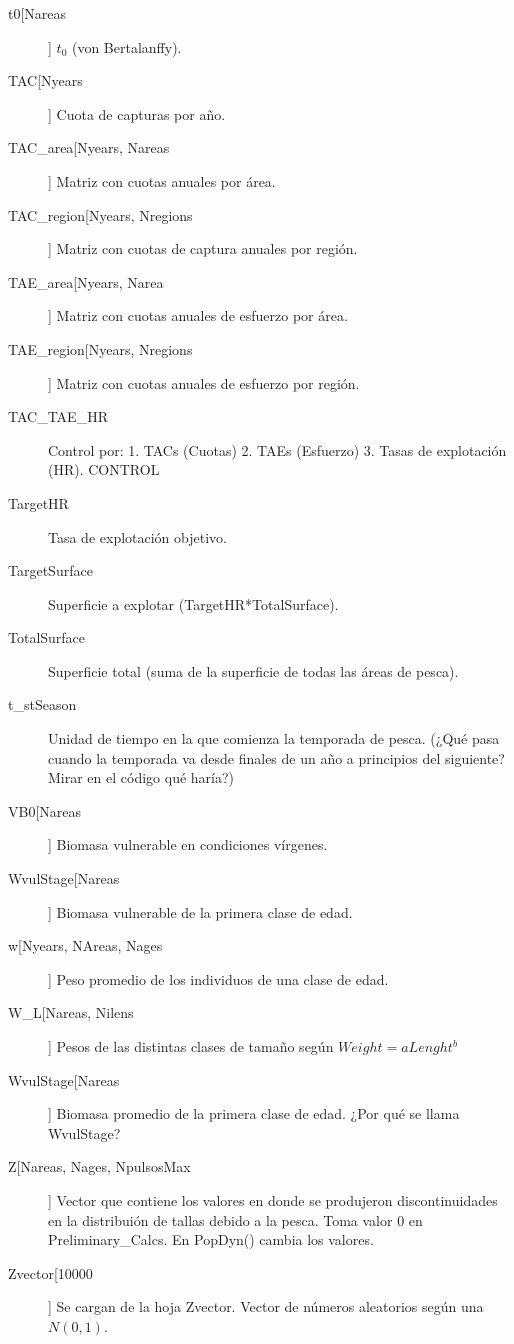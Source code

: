 \documentclass[12pt, oneside, a4paper]{article}
\begin{document}
\begin{description}
		\item[t0[Nareas]] $t_0$ (von Bertalanffy).
		\item[TAC[Nyears]] Cuota de capturas por año.
		\item[TAC\_area[Nyears, Nareas]] Matriz con cuotas anuales por área.
		\item[TAC\_region[Nyears, Nregions]] Matriz con cuotas de captura anuales por región.
		\item[TAE\_area[Nyears, Narea]] Matriz con cuotas anuales de esfuerzo por área.
		\item[TAE\_region[Nyears, Nregions]] Matriz con cuotas anuales de esfuerzo por región. 
		\item[TAC\_TAE\_HR] Control por: 1. TACs (Cuotas) 2. TAEs (Esfuerzo) 3. Tasas de explotación (HR). CONTROL
		\item[TargetHR] Tasa de explotación objetivo.
		\item[TargetSurface] Superficie a explotar (TargetHR*TotalSurface).
		\item[TotalSurface] Superficie total (suma de la superficie de todas las áreas de pesca).
		\item[t\_stSeason] Unidad de tiempo en la que comienza la temporada de pesca. (¿Qué pasa cuando la temporada va desde finales de un año a principios del siguiente?Mirar en el código qué haría?)
		
		\item[VB0[Nareas]] Biomasa vulnerable en condiciones vírgenes. 
		\item[WvulStage[Nareas]] Biomasa vulnerable de la primera clase de edad.
		
		\item[w[Nyears, NAreas, Nages]] Peso promedio de los individuos de una clase de edad.
		\item[W\_L[Nareas, Nilens]] Pesos de las distintas clases de tamaño según $Weight=a Lenght^b$
		\item[WvulStage[Nareas]] Biomasa promedio de la primera clase de edad. ¿Por qué se llama WvulStage?
		   
		\item[Z[Nareas, Nages, NpulsosMax]] Vector que contiene los valores en donde se produjeron discontinuidades en la distribuión de tallas debido a la pesca. Toma valor 0 en Preliminary\_Calcs. En PopDyn() cambia los valores.
		\item[Zvector[10000]] Se cargan de la hoja Zvector.
		Vector de números aleatorios según una $N(0,1)$.
		
		\end{description}
\end{document}
